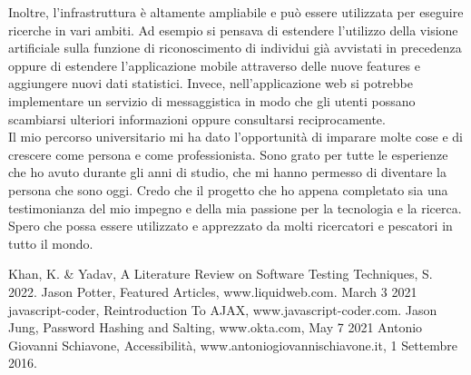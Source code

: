 \documentclass[a4paper,final,12pt]{report}
\begin{document}
Inoltre, l'infrastruttura è altamente ampliabile e può essere utilizzata per eseguire ricerche in vari ambiti. Ad esempio si pensava di estendere l'utilizzo della visione artificiale sulla funzione di riconoscimento di individui già avvistati in precedenza oppure di estendere l'applicazione mobile attraverso delle nuove features e aggiungere nuovi dati statistici. Invece, nell'applicazione web si potrebbe implementare un servizio di messaggistica in modo che gli utenti possano scambiarsi ulteriori informazioni oppure consultarsi reciprocamente.\\

Il mio percorso universitario mi ha dato l'opportunità di imparare molte cose e di crescere come persona e come professionista. Sono grato per tutte le esperienze che ho avuto durante gli anni di studio, che mi hanno permesso di diventare la persona che sono oggi. Credo che il progetto che ho appena completato sia una testimonianza del mio impegno e della mia passione per la tecnologia e la ricerca. Spero che possa essere utilizzato e apprezzato da molti ricercatori e pescatori in tutto il mondo.



\begin{thebibliography}{100}
 Khan, K. \& Yadav, A Literature Review on Software Testing Techniques, S. 2022.
 Jason Potter, Featured Articles, www.liquidweb.com. March 3 2021
 javascript-coder, Reintroduction To AJAX, www.javascript-coder.com.
 Jason Jung, Password Hashing and Salting, www.okta.com, May 7 2021
 Antonio Giovanni Schiavone, Accessibilità, www.antoniogiovannischiavone.it, 1 Settembre 2016.
\end{thebibliography}
\end{document}
